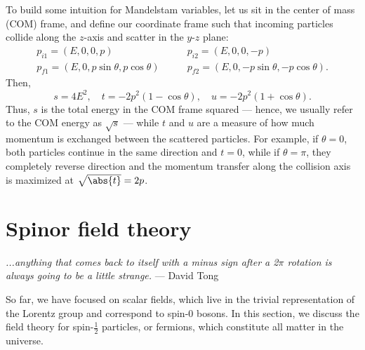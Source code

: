 To build some intuition for Mandelstam variables, let us sit in the center of mass (COM) frame, and define our coordinate frame such that incoming particles collide along the $z$-axis and scatter in the $y$-$z$ plane:
\begin{equation}
	\label{eq:01_qft_interactions_mandelstam_pcom}
	\begin{split}
		p_{i1} = (E, 0, 0, p) &\qquad p_{i2} = (E, 0, 0, -p) \\
		p_{f1} = (E, 0, p\sin\theta, p\cos\theta) &\qquad p_{f2} = (E, 0, -p\sin\theta, -p\cos\theta).
	\end{split}
\end{equation}
Then,
\begin{equation}
	\label{eq:01_qft_interactions_mandelstam_com}
	s = 4E^2, \quad t = -2p^2(1-\cos\theta), \quad u = -2p^2(1+\cos\theta).
\end{equation}
Thus, $s$ is the total energy in the COM frame squared --- hence, we usually refer to the COM energy as $\sqrt{s}$ --- while $t$ and $u$ are a measure of how much momentum is exchanged between the scattered particles.
For example, if $\theta = 0$, both particles continue in the same direction and $t = 0$, while if $\theta = \pi$, they completely
reverse direction and the momentum transfer along the collision axis is maximized at $\sqrt{\abs{t}} = 2p$.



\section{Spinor field theory}
\label{sec:01_qft_spinors}

\begin{center}
	\centering
	\noindent
	\textit{...anything that comes back to itself with a minus sign after a 2$\pi$ rotation is always going to be a little strange.} --- David Tong~\cite{TongSM}
\end{center}

So far, we have focused on scalar fields, which live in the trivial representation of the Lorentz group and correspond to spin-$0$ bosons.
In this section, we discuss the field theory for spin-$\frac{1}{2}$ particles, or fermions, which constitute all matter in the universe.

